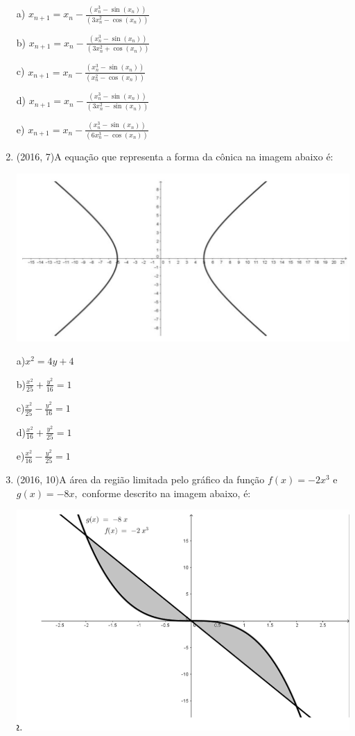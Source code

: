 \documentclass{article}
\begin{document}
\begin{enumerate}
a) $x_{n+1} = x_n -\frac{(x_ n^3 -\sin{(x_n)})}{(3x_n^2 -\cos{(x_n)})}$

b) $x_{n+1} = x_n -\frac{(x_ n^3 -\sin{(x_n)})}{(3x_n^2 +\cos{(x_n)})}$

c) $x_{n+1} = x_n -\frac{(x_ n^3 -\sin{(x_n)})}{(x_n^2 -\cos{(x_n)})}$

d) $x_{n+1} = x_n -\frac{(x_ n^3 -\sin{(x_n)})}{(3x_n^2 -\sin{(x_n)})}$

e) $x_{n+1} = x_n -\frac{(x_ n^3 -\sin{(x_n)})}{(6x_n^3 -\cos{(x_n)})}$





\item (2016, 7)A equação que representa a forma da cônica na imagem abaixo é:\newline

\includegraphics[width=10 cm]{07-2016.png}\newline

a)$x^2 = 4y + 4$

b)$ \frac{x^2}{25} + \frac{y^2}{16} = 1$

c)$ \frac{x^2}{25} - \frac{y^2}{16} = 1$

d)$ \frac{x^2}{16} + \frac{y^2}{25} = 1 $

e)$ \frac{x^2}{16} - \frac{y^2}{25} = 1 $\newline






\item (2016, 10)A área da região limitada pelo gráfico da função $f(x) = -2x^3$ e $g(x) = -8x,$ conforme
descrito na imagem abaixo, é:\newline

\includegraphics[width=10 cm]{10-2016.png}\newline


\end{enumerate}
\end{document}
